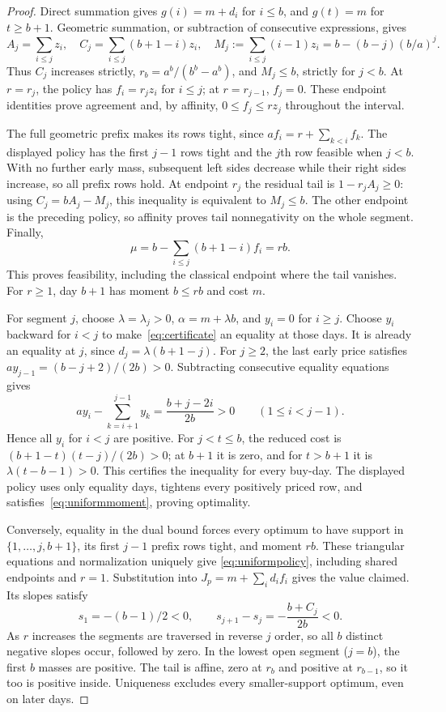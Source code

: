 \documentclass[manuscript,11pt,screen,nonacm]{acmart}
\begin{document}
\begin{proof}
Direct summation gives $g(i)=m+d_i$ for $i\le b$, and $g(t)=m$ for
$t\ge b+1$. Geometric summation, or subtraction of consecutive expressions,
gives
\[
 A_j=\sum_{i\le j}z_i,\quad
 C_j=\sum_{i\le j}(b+1-i)z_i,\quad
 M_j:=\sum_{i\le j}(i-1)z_i=b-(b-j)(b/a)^j.
\]
Thus $C_j$ increases strictly, $r_b=a^b/(b^b-a^b)$, and $M_j\le b$,
strictly for $j<b$. At $r=r_j$, the policy has $f_i=r_jz_i$ for
$i\le j$; at $r=r_{j-1}$, $f_j=0$. These endpoint identities prove
agreement and, by affinity, $0\le f_j\le rz_j$ throughout the interval.

The full geometric prefix makes its rows tight, since
$af_i=r+\sum_{k<i}f_k$. The displayed policy has the first $j-1$ rows
tight and the $j$th row feasible when $j<b$. With no further early mass,
subsequent left sides decrease while their right sides increase, so all
prefix rows hold. At endpoint $r_j$ the residual tail is $1-r_jA_j\ge0$:
using $C_j=bA_j-M_j$, this inequality is equivalent to $M_j\le b$.
The other endpoint is the preceding policy, so affinity proves tail
nonnegativity on the whole segment. Finally,
\begin{equation}\label{eq:uniformmoment}
 \mu=b-\sum_{i\le j}(b+1-i)f_i=rb.
\end{equation}
This proves feasibility, including the classical endpoint where the tail
vanishes. For $r\ge1$, day $b+1$ has moment $b\le rb$ and cost $m$.

For segment $j$, choose $\lambda=\lambda_j>0$,
$\alpha=m+\lambda b$, and $y_i=0$ for $i\ge j$. Choose $y_i$ backward
for $i<j$ to make~\eqref{eq:certificate} an equality at those days.
It is already an equality at $j$, since $d_j=\lambda(b+1-j)$.
For $j\ge2$, the last early price satisfies
$ay_{j-1}=(b-j+2)/(2b)>0$. Subtracting consecutive equality equations gives
\begin{equation}\label{eq:uniformdual}
 ay_i-\sum_{k=i+1}^{j-1}y_k=\frac{b+j-2i}{2b}>0\qquad(1\le i<j-1).
\end{equation}
Hence all $y_i$ for $i<j$ are positive. For $j<t\le b$, the reduced
cost is $(b+1-t)(t-j)/(2b)>0$; at $b+1$ it is zero, and for $t>b+1$
it is $\lambda(t-b-1)>0$. This certifies the inequality for every buy-day.
The displayed policy uses only equality days, tightens every positively
priced row, and satisfies~\eqref{eq:uniformmoment}, proving optimality.

Conversely, equality in the dual bound forces every optimum to have support
in $\{1,\ldots,j,b+1\}$, its first $j-1$ prefix rows tight, and moment
$rb$. These triangular equations and normalization uniquely give
\eqref{eq:uniformpolicy}, including shared endpoints and $r=1$.
Substitution into $J_p=m+\sum_i d_if_i$ gives the value claimed. Its slopes
satisfy
\[
 s_1=-(b-1)/2<0,\qquad s_{j+1}-s_j=-\frac{b+C_j}{2b}<0.
\]
As $r$ increases the segments are traversed in reverse $j$ order, so all
$b$ distinct negative slopes occur, followed by zero. In the lowest open
segment ($j=b$), the first $b$ masses are positive. The tail is affine,
zero at $r_b$ and positive at $r_{b-1}$, so it too is positive inside.
Uniqueness excludes every smaller-support optimum, even on later days.


\end{proof}
\end{document}
